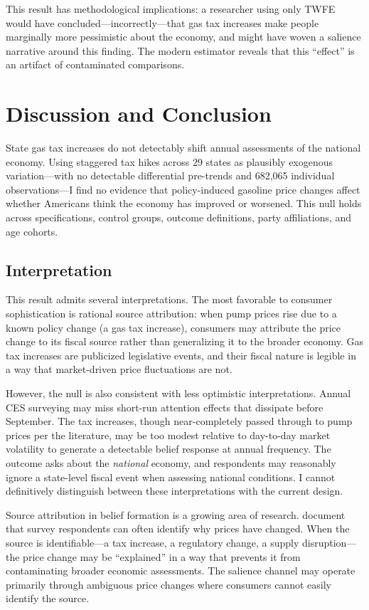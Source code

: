 \documentclass[12pt]{article}
\begin{document}
This result has methodological implications: a researcher using only TWFE would have concluded---incorrectly---that gas tax increases make people marginally more pessimistic about the economy, and might have woven a salience narrative around this finding. The modern estimator reveals that this ``effect'' is an artifact of contaminated comparisons.

\section{Discussion and Conclusion}

State gas tax increases do not detectably shift annual assessments of the national economy. Using staggered tax hikes across 29 states as plausibly exogenous variation---with no detectable differential pre-trends and 682,065 individual observations---I find no evidence that policy-induced gasoline price changes affect whether Americans think the economy has improved or worsened. This null holds across specifications, control groups, outcome definitions, party affiliations, and age cohorts.

\subsection{Interpretation}

This result admits several interpretations. The most favorable to consumer sophistication is rational source attribution: when pump prices rise due to a known policy change (a gas tax increase), consumers may attribute the price change to its fiscal source rather than generalizing it to the broader economy. Gas tax increases are publicized legislative events, and their fiscal nature is legible in a way that market-driven price fluctuations are not.

However, the null is also consistent with less optimistic interpretations. Annual CES surveying may miss short-run attention effects that dissipate before September. The tax increases, though near-completely passed through to pump prices per the literature, may be too modest relative to day-to-day market volatility to generate a detectable belief response at annual frequency. The outcome asks about the \textit{national} economy, and respondents may reasonably ignore a state-level fiscal event when assessing national conditions. I cannot definitively distinguish between these interpretations with the current design.

Source attribution in belief formation is a growing area of research. \citet{binder2018inflation} document that survey respondents can often identify why prices have changed. When the source is identifiable---a tax increase, a regulatory change, a supply disruption---the price change may be ``explained'' in a way that prevents it from contaminating broader economic assessments. The salience channel may operate primarily through ambiguous price changes where consumers cannot easily identify the source.
\end{document}
